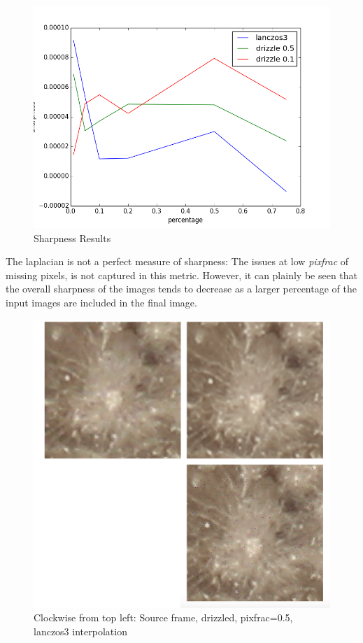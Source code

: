 \documentclass[conference]{IEEEtran}
\newcommand{\centerimage}[3]{
\begin{figure}[!h]  
\centering
#1
\caption{#2}
\label{#3}
\end{figure}}
\begin{document}
\centerimage{\includegraphics[width=0.9\columnwidth]{img/figure_1.png}}{Sharpness Results}{fig:sharpness}

The laplacian is not a perfect measure of sharpness: The issues at low
\textit{pixfrac} of missing pixels, is not captured in this
metric. However, it can plainly be seen that the overall sharpness of
the images tends to decrease as a larger percentage of the input
images are included in the final image.

\centerimage{\includegraphics[width=0.9\columnwidth]{img/results1.png}}{Clockwise from top left: Source frame, drizzled, pixfrac=0.5, lanczos3 interpolation}{fig:results1}
\end{document}
